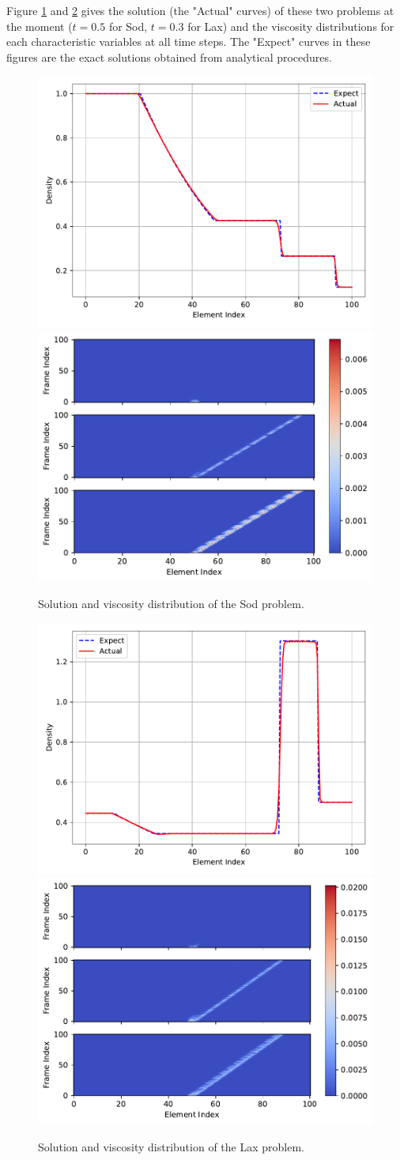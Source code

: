 \documentclass[10pt,draft]{article}
\begin{document}
Figure \ref{fig:sod} and \ref{fig:lax} gives the solution (the "Actual" curves) of these two problems at the moment ($t=0.5$ for Sod, $t=0.3$ for Lax) and the viscosity distributions for each characteristic variables at all time steps.
The "Expect" curves in these figures are the exact solutions obtained from analytical procedures.
\begin{figure}[H]
  \centering
  \includegraphics[width=.49\textwidth]{./sod/Frame100.pdf}
  \includegraphics[width=.49\textwidth]{./sod/Viscosity.pdf}
  \caption{Solution and viscosity distribution of the Sod problem.}
  \label{fig:sod}
\end{figure}

\begin{figure}[H]
  \centering
  \includegraphics[width=.49\textwidth]{./lax/Frame100.pdf}
  \includegraphics[width=.49\textwidth]{./lax/Viscosity.pdf}
  \caption{Solution and viscosity distribution of the Lax problem.}
  \label{fig:lax}
\end{figure}
\end{document}
